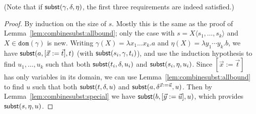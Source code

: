 \documentclass{lmcs}
\theoremstyle{theorem}\newtheorem{theorem}{Theorem}
\theoremstyle{theorem}\newtheorem{lemma}[theorem]{Lemma}
\theoremstyle{theorem}\newtheorem{corollary}[theorem]{Corollary}
\theoremstyle{definition}\newtheorem{definition}[theorem]{Definition}
\theoremstyle{definition}\newtheorem{example}[theorem]{Example}
\newcommand{\domain}{\mathtt{dom}}
\newcommand{\identifier}[1]{\mathtt{#1}}
\newcommand{\afun}{\identifier{f}}
\newcommand{\avar}{x}
\newcommand{\bvar}{y}
\newcommand{\Avar}{X}
\newcommand{\abs}[2]{\lambda #1.#2}
\newcommand{\meta}[2]{#1\langle#2\rangle}
\newcommand{\tuple}[2]{\llparenthesis #1,\dots,#2 \rrparenthesis}
\begin{document}
(Note that if $\mathsf{subst}(\gamma,\delta,\eta)$, the first three requirements are
indeed satisfied.)

\begin{proof}
By induction on the size of $s$.
Mostly this is the same as the proof of Lemma~\ref{lem:combinesubst:allbound};
only the case with $s = \meta{\Avar}{s_1,\dots,s_k}$ and $\Avar \in \domain(
\gamma)$ is new.  Writing $\gamma(\Avar) = \abs{\avar_1 \dots \avar_k}{a}$ and
$\eta(\Avar) = \abs{\bvar_1 \cdots \bvar_k}{b}$, we have
$\subrel{a,[\vec{\avar}:=\vec{t}],t}$ (with $\mathsf{subst}(s_i,\gamma,t_i)$), and use
the induction hypothesis to find $u_1,\dots,u_k$ such that both
$\mathsf{subst}(t_i,\delta,u_i)$ and $\mathsf{subst}(s_i,\eta,u_i)$.
Since $[\vec{\avar}:=\vec{t}]$ has only variables in its domain, we can use
Lemma~\ref{lem:combinesubst:allbound} to find $u$ such that both
$\mathsf{subst}(t,\delta,u)$ and $\subrel{a,\delta^{\vec{\avar}:=\vec{u}},u}$.
Then by Lemma~\ref{lem:combinesubst:special} we have $\subrel{b,[\vec{\bvar}:=
\vec{u}],u}$, which provides $\mathsf{subst}(s,\eta,u)$.

\end{proof}
\end{document}
